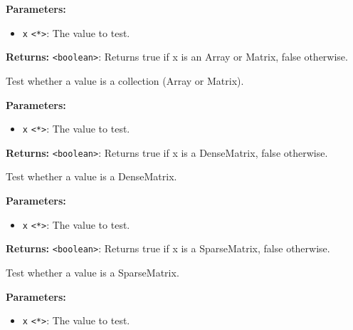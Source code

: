 \documentclass[12pt,a4paper]{article}
\begin{document}
\noindent \textbf{Parameters:}
\begin{itemize}
  \item \texttt{x} \texttt{<*>}: The value to test.
\end{itemize}

\noindent \textbf{Returns:} \texttt{<boolean>}: Returns true if \textasciigrave{}x\textasciigrave{} is an Array or Matrix, false otherwise.

\noindent Test whether a value is a collection (Array or Matrix).

\vspace{5mm}
\noindent {}


\noindent \textbf{Parameters:}
\begin{itemize}
  \item \texttt{x} \texttt{<*>}: The value to test.
\end{itemize}

\noindent \textbf{Returns:} \texttt{<boolean>}: Returns true if \textasciigrave{}x\textasciigrave{} is a DenseMatrix, false otherwise.

\noindent Test whether a value is a DenseMatrix.

\vspace{5mm}
\noindent {}


\noindent \textbf{Parameters:}
\begin{itemize}
  \item \texttt{x} \texttt{<*>}: The value to test.
\end{itemize}

\noindent \textbf{Returns:} \texttt{<boolean>}: Returns true if \textasciigrave{}x\textasciigrave{} is a SparseMatrix, false otherwise.

\noindent Test whether a value is a SparseMatrix.

\vspace{5mm}
\noindent {}


\noindent \textbf{Parameters:}
\begin{itemize}
  \item \texttt{x} \texttt{<*>}: The value to test.
\end{itemize}
\end{document}
